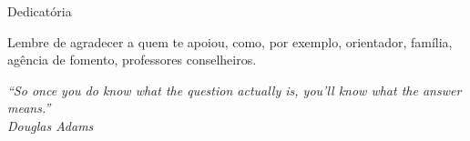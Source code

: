 \begin{dedicatoria}
    \vspace*{\fill}
    \hfill
    \begin{minipage}{.6\textwidth}
     Dedicatória%
    \end{minipage}
\end{dedicatoria}
 
\begin{agradecimentos}
    Lembre de agradecer a quem te apoiou, como, por exemplo, orientador,
    família, agência de fomento, professores conselheiros. %
\end{agradecimentos}

\begin{epigrafe}
\vspace*{\fill}

\begin{flushright}
    \hspace{7.5cm}
    \textit{
        ``So once you do know what the question actually is, you'll know what the answer means.''} \\
        \textit{Douglas Adams} %
\end{flushright}
\end{epigrafe}